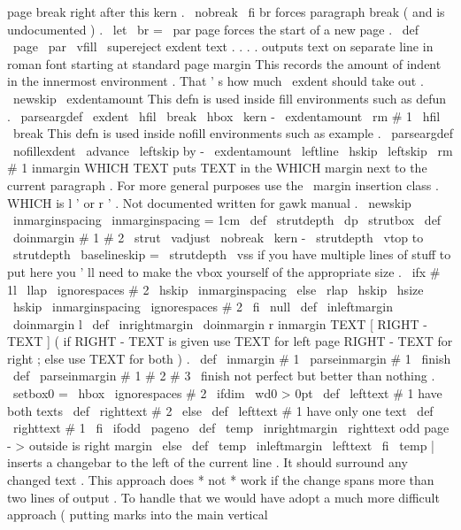 {{page
break
right
after
this
kern
.
\
nobreak
\
fi
}
%
br
forces
paragraph
break
(
and
is
undocumented
)
.
\
let
\
br
=
\
par
%
page
forces
the
start
of
a
new
page
.
%
\
def
\
page
{
\
par
\
vfill
\
supereject
}
%
exdent
text
.
.
.
.
%
outputs
text
on
separate
line
in
roman
font
starting
at
standard
page
margin
%
This
records
the
amount
of
indent
in
the
innermost
environment
.
%
That
'
s
how
much
\
exdent
should
take
out
.
\
newskip
\
exdentamount
%
This
defn
is
used
inside
fill
environments
such
as
defun
.
\
parseargdef
\
exdent
{
\
hfil
\
break
\
hbox
{
\
kern
-
\
exdentamount
{
\
rm
#
1
}
}
\
hfil
\
break
}
%
This
defn
is
used
inside
nofill
environments
such
as
example
.
\
parseargdef
\
nofillexdent
{
{
\
advance
\
leftskip
by
-
\
exdentamount
\
leftline
{
\
hskip
\
leftskip
{
\
rm
#
1
}
}
}
}
%
inmargin
{
WHICH
}
{
TEXT
}
puts
TEXT
in
the
WHICH
margin
next
to
the
current
%
paragraph
.
For
more
general
purposes
use
the
\
margin
insertion
%
class
.
WHICH
is
l
'
or
r
'
.
Not
documented
written
for
gawk
manual
.
%
\
newskip
\
inmarginspacing
\
inmarginspacing
=
1cm
\
def
\
strutdepth
{
\
dp
\
strutbox
}
%
\
def
\
doinmargin
#
1
#
2
{
\
strut
\
vadjust
{
%
\
nobreak
\
kern
-
\
strutdepth
\
vtop
to
\
strutdepth
{
%
\
baselineskip
=
\
strutdepth
\
vss
%
if
you
have
multiple
lines
of
stuff
to
put
here
you
'
ll
need
to
%
make
the
vbox
yourself
of
the
appropriate
size
.
\
ifx
#
1l
%
\
llap
{
\
ignorespaces
#
2
\
hskip
\
inmarginspacing
}
%
\
else
\
rlap
{
\
hskip
\
hsize
\
hskip
\
inmarginspacing
\
ignorespaces
#
2
}
%
\
fi
\
null
}
%
}
}
\
def
\
inleftmargin
{
\
doinmargin
l
}
\
def
\
inrightmargin
{
\
doinmargin
r
}
%
%
inmargin
{
TEXT
[
RIGHT
-
TEXT
]
}
%
(
if
RIGHT
-
TEXT
is
given
use
TEXT
for
left
page
RIGHT
-
TEXT
for
right
;
%
else
use
TEXT
for
both
)
.
%
\
def
\
inmargin
#
1
{
\
parseinmargin
#
1
\
finish
}
\
def
\
parseinmargin
#
1
#
2
#
3
\
finish
{
%
not
perfect
but
better
than
nothing
.
\
setbox0
=
\
hbox
{
\
ignorespaces
#
2
}
%
\
ifdim
\
wd0
>
0pt
\
def
\
lefttext
{
#
1
}
%
have
both
texts
\
def
\
righttext
{
#
2
}
%
\
else
\
def
\
lefttext
{
#
1
}
%
have
only
one
text
\
def
\
righttext
{
#
1
}
%
\
fi
%
\
ifodd
\
pageno
\
def
\
temp
{
\
inrightmargin
\
righttext
}
%
odd
page
-
>
outside
is
right
margin
\
else
\
def
\
temp
{
\
inleftmargin
\
lefttext
}
%
\
fi
\
temp
}
%
|
inserts
a
changebar
to
the
left
of
the
current
line
.
It
should
%
surround
any
changed
text
.
This
approach
does
*
not
*
work
if
the
%
change
spans
more
than
two
lines
of
output
.
To
handle
that
we
would
%
have
adopt
a
much
more
difficult
approach
(
putting
marks
into
the
main
%
vertical
}
